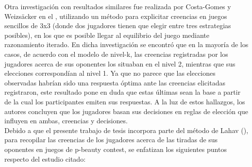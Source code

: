 Otra investigación con resultados similares fue realizada por Costa-Gomes y Weizsäcker en el \citeyear{Costa-Gomes}, utilizando un método para explicitar creencias en juegos sencillos de 3x3 (donde dos jugadores tienen que elegir entre tres estrategias posibles), en los que es posible llegar al equilibrio del juego mediante razonamiento iterado. En dicha investigación se encontró que en la mayoría de los casos, de acuerdo con el modelo de nivel-k, las creencias registradas por los jugadores acerca de sus oponentes los situaban en el nivel 2, mientras que sus elecciones correspondían al nivel 1. Ya que no parece que las elecciones observadas habrían sido una respuesta óptima ante las creencias elicitadas registraron, este resultado pone en duda que estas últimas sean la base a partir de la cual los participantes emiten sus respuestas. A la luz de estos hallazgos, los autores concluyen que los jugadores basan sus decisiones en reglas de elección que influyen en ambas, creencias y decisiones.\\

Debido a que el presente trabajo de tesis incorpora parte del método de Lahav (\citeyear{Lahav}), para recopilar las creencias de los jugadores acerca de las tiradas de sus oponentes en juegos de p-beauty contest, se enfatizan los siguientes puntos respecto del estudio citado: \\

